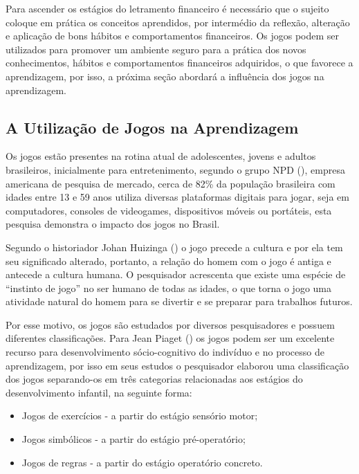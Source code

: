 Para ascender os estágios do letramento financeiro é necessário que o sujeito coloque em prática os conceitos aprendidos, por intermédio da reflexão, alteração e aplicação de bons hábitos e comportamentos financeiros. Os jogos podem ser utilizados para promover um ambiente seguro para a prática dos novos conhecimentos, hábitos e comportamentos financeiros adquiridos, o que favorece a aprendizagem, por isso, a próxima seção abordará a influência dos jogos na aprendizagem.

\subsection{A Utilização de Jogos na Aprendizagem}
Os jogos estão presentes na rotina atual de adolescentes, jovens e adultos brasileiros, inicialmente para entretenimento, segundo o grupo NPD (\citeyear{npd2015}), empresa americana de pesquisa de mercado, cerca de 82\% da população brasileira com idades entre 13 e 59 anos utiliza diversas plataformas digitais para jogar, seja em computadores, consoles de videogames, dispositivos móveis ou portáteis, esta pesquisa demonstra o impacto dos jogos no Brasil.

Segundo o historiador Johan Huizinga (\citeyear{huizinga2000}) o jogo precede a cultura e por ela tem seu significado alterado, portanto, a relação do homem com o jogo é antiga e antecede a cultura humana. O pesquisador acrescenta que existe uma espécie de “instinto de jogo” no ser humano de todas as idades, o que torna o jogo uma atividade natural do homem para se divertir e se preparar para trabalhos futuros.

Por esse motivo, os jogos são estudados por diversos pesquisadores e possuem diferentes classificações.  Para Jean Piaget (\citeyear{piaget1969}) os jogos podem ser um excelente recurso para desenvolvimento sócio-cognitivo do indivíduo e no processo de aprendizagem, por isso em seus estudos o pesquisador elaborou uma classificação dos jogos separando-os em três categorias relacionadas aos estágios do desenvolvimento infantil, na seguinte forma:

\begin{itemize}
    \item Jogos de exercícios - a partir do estágio sensório motor;
    \item Jogos simbólicos - a partir do estágio pré-operatório;
    \item Jogos de regras - a partir do estágio operatório concreto.
\end{itemize}

